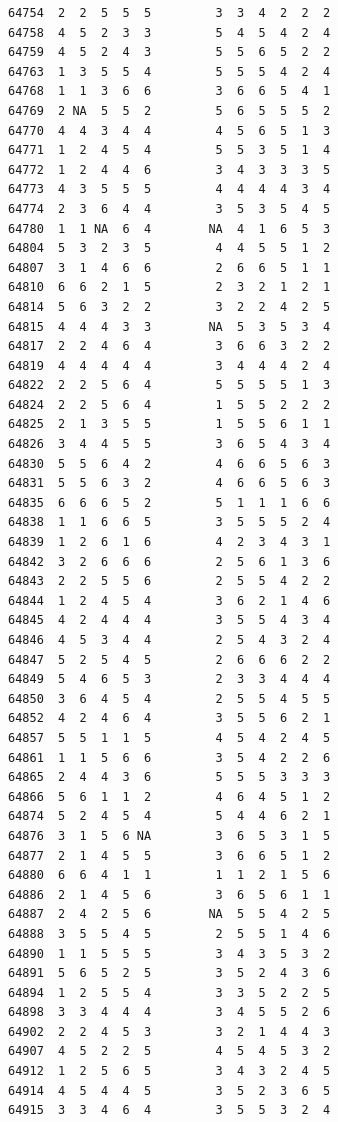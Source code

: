 \documentclass[
  letterpaper,
  DIV=11,
  numbers=noendperiod]{scrreprt}
\begin{document}
\begin{verbatim}
64754  2  2  5  5  5         3  3  4  2  2  2
64758  4  5  2  3  3         5  4  5  4  2  4
64759  4  5  2  4  3         5  5  6  5  2  2
64763  1  3  5  5  4         5  5  5  4  2  4
64768  1  1  3  6  6         3  6  6  5  4  1
64769  2 NA  5  5  2         5  6  5  5  5  2
64770  4  4  3  4  4         4  5  6  5  1  3
64771  1  2  4  5  4         5  5  3  5  1  4
64772  1  2  4  4  6         3  4  3  3  3  5
64773  4  3  5  5  5         4  4  4  4  3  4
64774  2  3  6  4  4         3  5  3  5  4  5
64780  1  1 NA  6  4        NA  4  1  6  5  3
64804  5  3  2  3  5         4  4  5  5  1  2
64807  3  1  4  6  6         2  6  6  5  1  1
64810  6  6  2  1  5         2  3  2  1  2  1
64814  5  6  3  2  2         3  2  2  4  2  5
64815  4  4  4  3  3        NA  5  3  5  3  4
64817  2  2  4  6  4         3  6  6  3  2  2
64819  4  4  4  4  4         3  4  4  4  2  4
64822  2  2  5  6  4         5  5  5  5  1  3
64824  2  2  5  6  4         1  5  5  2  2  2
64825  2  1  3  5  5         1  5  5  6  1  1
64826  3  4  4  5  5         3  6  5  4  3  4
64830  5  5  6  4  2         4  6  6  5  6  3
64831  5  5  6  3  2         4  6  6  5  6  3
64835  6  6  6  5  2         5  1  1  1  6  6
64838  1  1  6  6  5         3  5  5  5  2  4
64839  1  2  6  1  6         4  2  3  4  3  1
64842  3  2  6  6  6         2  5  6  1  3  6
64843  2  2  5  5  6         2  5  5  4  2  2
64844  1  2  4  5  4         3  6  2  1  4  6
64845  4  2  4  4  4         3  5  5  4  3  4
64846  4  5  3  4  4         2  5  4  3  2  4
64847  5  2  5  4  5         2  6  6  6  2  2
64849  5  4  6  5  3         2  3  3  4  4  4
64850  3  6  4  5  4         2  5  5  4  5  5
64852  4  2  4  6  4         3  5  5  6  2  1
64857  5  5  1  1  5         4  5  4  2  4  5
64861  1  1  5  6  6         3  5  4  2  2  6
64865  2  4  4  3  6         5  5  5  3  3  3
64866  5  6  1  1  2         4  6  4  5  1  2
64874  5  2  4  5  4         5  4  4  6  2  1
64876  3  1  5  6 NA         3  6  5  3  1  5
64877  2  1  4  5  5         3  6  6  5  1  2
64880  6  6  4  1  1         1  1  2  1  5  6
64886  2  1  4  5  6         3  6  5  6  1  1
64887  2  4  2  5  6        NA  5  5  4  2  5
64888  3  5  5  4  5         2  5  5  1  4  6
64890  1  1  5  5  5         3  4  3  5  3  2
64891  5  6  5  2  5         3  5  2  4  3  6
64894  1  2  5  5  4         3  3  5  2  2  5
64898  3  3  4  4  4         3  4  5  5  2  6
64902  2  2  4  5  3         3  2  1  4  4  3
64907  4  5  2  2  5         4  5  4  5  3  2
64912  1  2  5  6  5         3  4  3  2  4  5
64914  4  5  4  4  5         3  5  2  3  6  5
64915  3  3  4  6  4         3  5  5  3  2  4

\end{verbatim}
\end{document}
